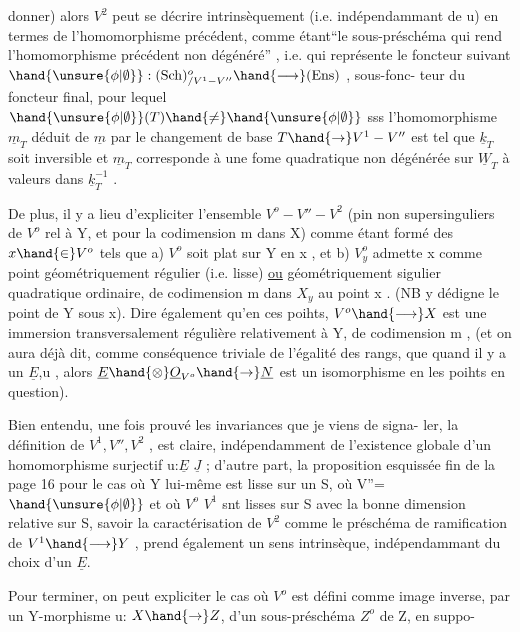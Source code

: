 donner) alors $V^2$ peut se décrire intrinsèquement (i.e. indépendammant de u)
 en termes de l'homomorphisme précédent, comme étant``le sous-préschéma
qui rend l'homomorphisme précédent non dégénéré'' , i.e. qui représente le
foncteur suivant $\hand{\unsure{\phi|\emptyset}} : (\mathrm{Sch})^{o}_{/V^1 - V''} \hand{\longrightarrow} (\mathrm{Ens})$ , sous-fonc-%
teur du foncteur final, pour lequel $\hand{\unsure{\phi|\emptyset}}(T)\hand{\neq} \hand{\unsure{\phi|\emptyset}}$ sss l'homomorphisme $\underline{m}_T$ déduit
de $\underline{m}$ par le changement de base $T \hand{\to} V^1 - V''$ est tel que $\underline{k}_T$ soit inversible et
$\underline{m}_T$ corresponde à une fome quadratique non dégénérée sur $\underline{W}_T$ à valeurs dans
$\underline{k}_T^{-1}$ .

De plus, il y a lieu  d'expliciter l'ensemble $V^o - V'' - V^2$ 
(pin non supersinguliers de $V^o$ rel à Y, et pour la codimension m dans X)
comme étant formé des $x \hand{\in} V^o$ tels que a) $V^o$ soit plat sur Y en x , et
b) $V^o_y$ admette x comme point géométriquement régulier (i.e. lisse) \uline{ou}
géométriquement sigulier quadratique ordinaire, de codimension m dans $X_y$
au point x . (NB y dédigne le point de Y sous x). Dire également qu'en ces
poihts, $V^o \hand{\longrightarrow} X$ est une immersion transversalement régulière relativement à
Y, de codimension m , (et on aura déjà dit, comme conséquence triviale de
l'égalité des rangs, que quand il y a un $\underline{E}$,u , alors $\underline{E}\hand{\otimes}\underline{O}_{V^o} \hand{\to} \underline{N}$ est un
isomorphisme en les poihts en question).

Bien entendu, une fois prouvé les invariances que je viens de signa-%
ler, la définition de $V^1, V'', V^2$ ,  est claire, indépendamment
de l'existence globale d'un homomorphisme surjectif u:$\underline{E}$ \quad $\underline{J}$ ; d'autre part,
la proposition esquissée fin de la page 16 pour le cas où Y lui-même est
lisse sur un S, où V''= $\hand{\unsure{\phi|\emptyset}}$ et où $V^o$\hand{,} $V^1$ snt lisses sur S avec la bonne dimension
relative sur S,  savoir la caractérisation de $V^{2}$ comme le
préschéma de ramification de $V^1 \hand{\longrightarrow} Y$ , prend également un sens intrinsèque,
indépendammant du choix d'un $\underline{E}$.

Pour terminer, on peut expliciter le cas où $V^o$ est défini comme image
inverse, par un Y-morphisme u: $X \hand{\to} Z$, d'un sous-préschéma $Z^o$ de Z, en suppo-%
